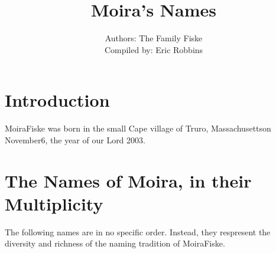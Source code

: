 \documentclass[12pt]{book}
\newcommand{\cat}{Moira}
\newcommand{\birthMonth}{November}
\newcommand{\birthDay}{6}
\newcommand{\birthYear}{2003}
\newcommand{\birthPlace}{Truro, Massachusetts}
\begin{document}
\title{\cat's Names}
\author{Authors: The Family Fiske
	\\Compiled by: Eric Robbins}
\maketitle
\section*{Introduction}
\cat Fiske was born in the small Cape village of \birthPlace on \birthMonth \birthDay, the year of our Lord \birthYear.
\section*{The Names of Moira, in their Multiplicity}
The following names are in no specific order. Instead, they respresent the diversity and richness of the naming tradition of \cat Fiske.
\end{document}
